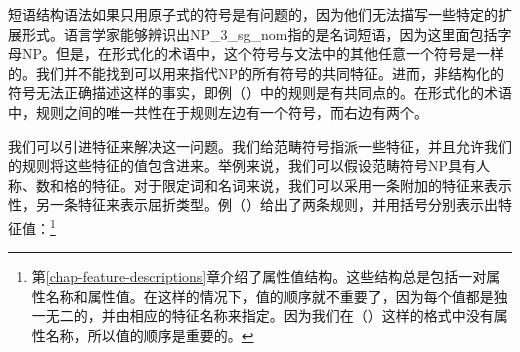 短语结构语法如果只用原子式的符号是有问题的，因为他们无法描写一些特定的扩展形式。语言学家能够辨识出NP\_3\_sg\_nom指的是名词短语，因为这里面包括字母NP。但是，在形式化的术语中，这个符号与文法中的其他任意一个符号是一样的。我们并不能找到可以用来指代NP的所有符号的共同特征。进而，非结构化的符号无法正确描述这样的事实，即例（）中的规则是有共同点的。在形式化的术语中，规则之间的唯一共性在于规则左边有一个符号，而右边有两个。

我们可以引进特征来解决这一问题。我们给范畴符号指派一些特征，并且允许我们的规则将这些特征的值包含进来。举例来说，我们可以假设范畴符号NP具有人称、数和格的特征。对于限定词和名词来说，我们可以采用一条附加的特征来表示性，另一条特征来表示屈折类型。例（）给出了两条规则，并用括号分别表示出特征值：\footnote{%
第\ref{chap-feature-descriptions}章介绍了属性值结构。这些结构总是包括一对属性名称和属性值。在这样的情况下，值的顺序就不重要了，因为每个值都是独一无二的，并由相应的特征名称来指定。因为我们在（）这样的格式中没有属性名称，所以值的顺序是重要的。
}

